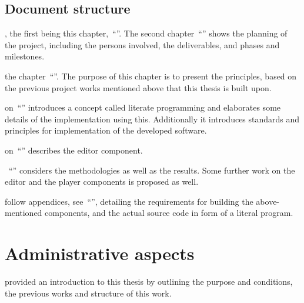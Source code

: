 \documentclass[%
    a4paper,    %
    justified,  %
    nobib,      %
    openany     %
]{tufte-book}
\begin{document}
\section{Document structure}
\label{sec:document-structure}

, the first being this
chapter,~\enquote{}. The second
chapter~\enquote{} shows the planning of
the project, including the persons involved, the deliverables, and phases and
milestones.

 the
chapter~\enquote{}. The purpose of this chapter is to
present the principles, based on the previous project works mentioned above that
this thesis is built upon.

 on~\enquote{}
introduces a concept called literate programming and elaborates some details of
the implementation using this. Additionally it introduces standards and
principles for implementation of the developed software.

 on~\enquote{}
describes the editor component.

~\enquote{}
considers the methodologies as well as the results. Some further work on the
editor and the player components is proposed as well.

 follow appendices,
see~\enquote{}, detailing the requirements for building the
above-mentioned components, and the actual source code in form of a literal
program.


\chapter{Administrative aspects}
\label{chap:administrative_aspects}

 provided an introduction to this thesis by
outlining the purpose and conditions, the previous works and structure of this
work.
\end{document}
